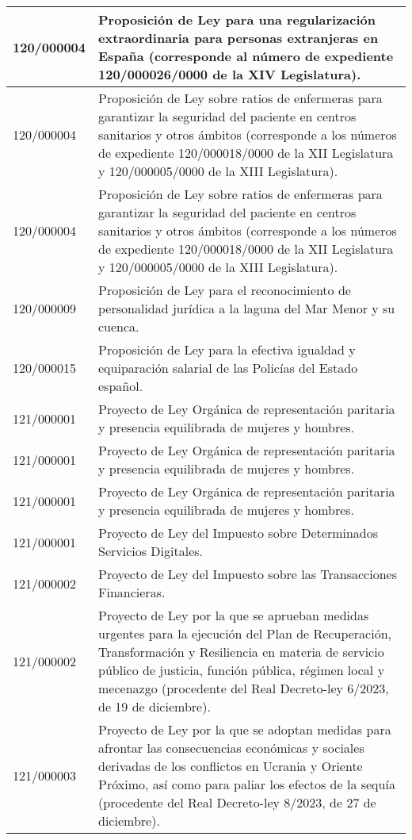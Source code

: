 {\begin{table}[H]
\begin{center}
\begin{tabularx}{\linewidth}{| l | X |}
\hline
120/000004 & Proposición de Ley para una regularización extraordinaria para personas extranjeras en España (corresponde al número de expediente 120/000026/0000 de la XIV Legislatura). \\
\hline
120/000004 & Proposición de Ley sobre ratios de enfermeras para garantizar la seguridad del paciente en centros sanitarios y otros ámbitos (corresponde a los números de expediente 120/000018/0000 de la XII Legislatura y 120/000005/0000 de la XIII Legislatura). \\
\hline
120/000004 & Proposición de Ley sobre ratios de enfermeras para garantizar la seguridad del paciente en centros sanitarios y otros ámbitos (corresponde a los números de expediente 120/000018/0000 de la XII Legislatura y 120/000005/0000 de la XIII Legislatura). \\
\hline
120/000009 & Proposición de Ley para el reconocimiento de personalidad jurídica a la laguna del Mar Menor y su cuenca. \\
\hline
120/000015 & Proposición de Ley para la efectiva igualdad y equiparación salarial de las Policías del Estado español. \\
\hline
121/000001 & Proyecto de Ley Orgánica de representación paritaria y presencia equilibrada de mujeres y hombres. \\
\hline
121/000001 & Proyecto de Ley Orgánica de representación paritaria y presencia equilibrada de mujeres y hombres. \\
\hline
121/000001 & Proyecto de Ley Orgánica de representación paritaria y presencia equilibrada de mujeres y hombres. \\
\hline
121/000001 & Proyecto de Ley del Impuesto sobre Determinados Servicios Digitales. \\
\hline
121/000002 & Proyecto de Ley del Impuesto sobre las Transacciones Financieras. \\
\hline
121/000002 & Proyecto de Ley por la que se aprueban medidas urgentes para la ejecución del Plan de Recuperación, Transformación y Resiliencia en materia de servicio público de justicia, función pública, régimen local y mecenazgo (procedente del Real Decreto-ley 6/2023, de 19 de diciembre). \\
\hline
121/000003 & Proyecto de Ley por la que se adoptan medidas para afrontar las consecuencias económicas y sociales derivadas de los conflictos en Ucrania y Oriente Próximo, así como para paliar los efectos de la sequía (procedente del Real Decreto-ley 8/2023, de 27 de diciembre). \\

\end{tabularx}
\end{center}
\end{table}}
